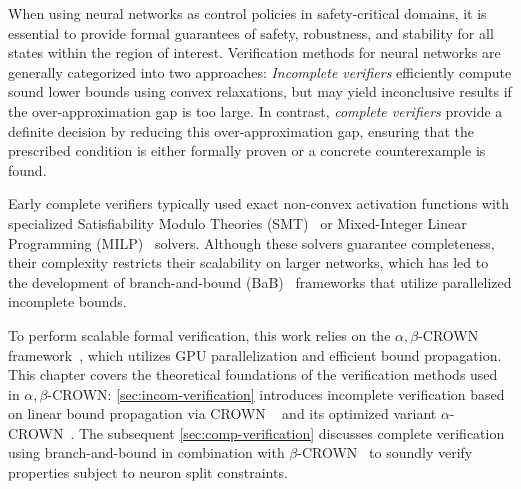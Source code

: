 When using neural networks as control policies in safety-critical domains, it is essential to provide 
formal guarantees of safety, robustness, and stability for all states within the region of interest. 
Verification methods for neural networks are generally categorized into two approaches: 
\emph{Incomplete verifiers} efficiently compute sound lower bounds using convex relaxations, but may yield inconclusive 
results if the over-approximation gap is too large.
In contrast, \emph{complete verifiers} provide a definite decision by reducing this over-approximation gap, 
ensuring that the prescribed condition is either formally proven or a concrete counterexample is found. 

Early complete verifiers typically used exact non-convex activation functions with specialized 
Satisfiability Modulo Theories (SMT)~\cite{katzReluplexEfficientSMT2017} or 
Mixed-Integer Linear Programming (MILP)~\cite{tjengEvaluatingRobustnessNeural2019} solvers.
Although these solvers guarantee completeness, their complexity restricts their scalability on larger networks, 
which has led to the development of branch-and-bound (BaB)~\cite{bunelUnifiedViewPiecewise2018} 
frameworks that utilize parallelized incomplete bounds.

To perform scalable formal verification, this work relies on the $\alpha,\beta$-CROWN 
framework~\cite{wang2021beta,xuFastCompleteEnabling2021}, which utilizes GPU parallelization and efficient bound propagation. 
This chapter covers the theoretical foundations of the verification methods used in $\alpha,\beta$-CROWN: 
\cref{sec:incom-verification} introduces incomplete verification based on linear bound propagation via CROWN
~\cite{zhangEfficientNeuralNetwork2018} and its optimized variant $\alpha$-CROWN~\cite{xuFastCompleteEnabling2021}. 
The subsequent \cref{sec:comp-verification} discusses complete verification using branch-and-bound in combination with 
$\beta$-CROWN~\cite{wang2021beta} to soundly verify properties subject to neuron split constraints.
